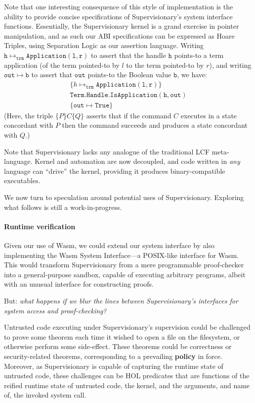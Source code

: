 \documentclass[sigplan, review]{acmart}
\newcommand{\deffont}[1]{\textbf{#1}}
\begin{document}
Note that one interesting consequence of this style of implementation is the ability to provide concise specifications of Supervisionary's system interface functions.
Essentially, the Supervisionary kernel is a grand exercise in pointer manipulation, and as such our ABI specifications can be expressed as Hoare Triples, using Separation Logic as our assertion language.
Writing $\mathtt{h} \mapsto_{\mathtt{trm}} \mathtt{Application(l, r)}$ to assert that the handle $\mathtt{h}$ points-to a term application (of the term pointed-to by $l$ to the term pointed-to by $r$), and writing $\mathtt{out} \mapsto \mathtt{b}$ to assert that $\mathtt{out}$ points-to the Boolean value $\mathtt{b}$, we have:
\begin{gather*}
\{ h \mapsto_{\mathtt{trm}} \mathtt{Application(l, r)} \} \\
\mathtt{Term.Handle.IsApplication(h, out)} \\
\{ \mathtt{out} \mapsto \mathtt{True} \}
\end{gather*}
(Here, the triple $\{ P \} C \{ Q \}$ asserts that if the command $C$ executes in a state concordant with $P$ then the command succeeds and produces a state concordant with $Q$.)

Note that Supervisionary lacks any analogue of the traditional LCF meta-language.
Kernel and automation are now decoupled, and code written in \emph{any} language can ``drive'' the kernel, providing it produces binary-compatible executables.

We now turn to speculation around potential uses of Supervisionary.
Exploring what follows is still a work-in-progress.


\paragraph{Runtime verification}

Given our use of Wasm, we could extend our system interface by also implementing the Wasm System Interface---a POSIX-like interface for Wasm.
This would transform Supervisionary from a mere programmable proof-checker into a general-purpose sandbox, capable of executing arbitrary programs, albeit with an unusual interface for constructing proofs.

But: \emph{what happens if we blur the lines between Supervisionary's interfaces for system access and proof-checking?}

Untrusted code executing under Supervisionary's supervision could be challenged to prove some theorem each time it wished to open a file on the filesystem, or otherwise perform some side-effect.
These theorems could be correctness or security-related theorems, corresponding to a prevailing \deffont{policy} in force.
Moreover, as Supervisionary is capable of capturing the runtime state of untrusted code, these challenges can be HOL predicates that are functions of the reified runtime state of untrusted code, the kernel, and the arguments, and name of, the invoked system call.
\end{document}
